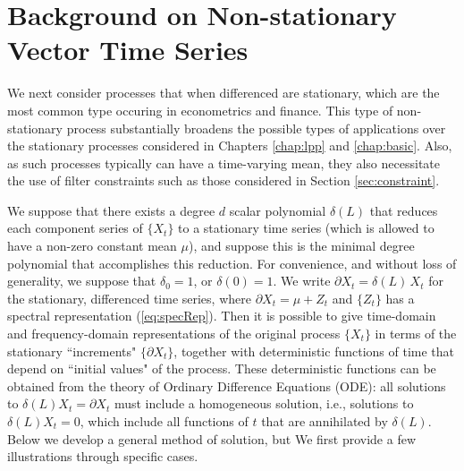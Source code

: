 \documentclass[a4paper]{book}
\begin{document}
  



\section{Background on Non-stationary Vector Time Series }
\label{sec:non-stat}

We next consider processes that when differenced are 
stationary, which are the most common type occuring in econometrics and finance.  
 This type of non-stationary process substantially broadens
  the possible types of applications over the stationary processes
   considered in Chapters \ref{chap:lpp} and \ref{chap:basic}.
  Also, as such processes typically can have a time-varying mean,
  they also necessitate the use of filter constraints such as those
   considered in Section \ref{sec:constraint}.
  
 We suppose that there exists a degree $d$ scalar polynomial $\delta (L)$
  that reduces each component series of $\{ X_t \}$ to a stationary
   time series (which is allowed to have a non-zero constant mean $\mu$),
   and suppose this is the minimal degree polynomial that accomplishes
    this reduction.  For convenience, and without loss of generality,
    we suppose that $\delta_0 = 1$, or $\delta (0) = 1$.
    We write $\partial X_t = \delta (L) \, X_t$ for
  the stationary, differenced time series,
   where $\partial X_t = \mu + Z_t$ and $\{ Z_t \}$ has a spectral
    representation (\ref{eq:specRep}).  Then it is possible
   to give time-domain and frequency-domain representations of
    the original process $\{ X_t \}$ in terms of the stationary
  ``increments" $\{ \partial X_t \}$, together with deterministic functions
  of time that depend on ``initial values" of the process.
   These deterministic functions can be obtained from 
   the theory of Ordinary Difference Equations (ODE): 
  all solutions to   $\delta (L) X_t = \partial X_t$
   must include a homogeneous solution, i.e., solutions to
    $\delta (L) X_t = 0$,   which include all functions of 
    $t$ that are annihilated by $\delta (L)$.  Below we develop
  a general method of solution, but We first provide a few
   illustrations through specific cases.
 
\end{document}
